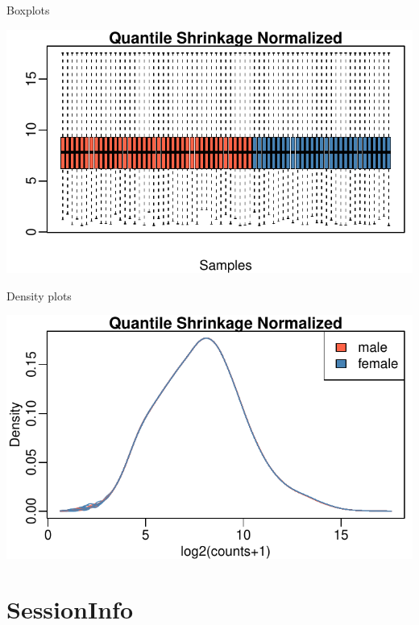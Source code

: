 \documentclass{article}\usepackage[]{graphicx}\usepackage[usenames,dvipsnames]{color}
\makeatletter
\def\maxwidth{ %
  \ifdim\Gin@nat@width>\linewidth
    \linewidth
  \else
    \Gin@nat@width
  \fi
}
\newenvironment{knitrout}{}{} %
\makeatother
\begin{document}
Boxplots
\begin{knitrout}
\color{fgcolor}

{\centering \includegraphics[width=\maxwidth]{figure/boxplots-normExprs-1} 

}



\end{knitrout}

Density plots
\begin{knitrout}
\color{fgcolor}

{\centering \includegraphics[width=\maxwidth]{figure/density-normExprs-1} 

}



\end{knitrout}


\section{SessionInfo}
\end{document}

